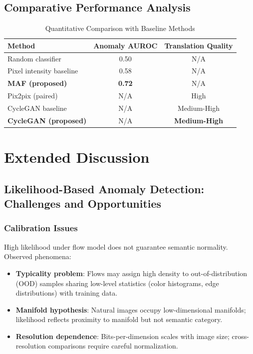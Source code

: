 \documentclass[conference]{IEEEtran}
\begin{document}
\subsection{Comparative Performance Analysis}
\begin{table}[!t]
\caption{Quantitative Comparison with Baseline Methods}
\label{tab:comparison}
\centering
\begin{tabular}{lcc}
\hline
\textbf{Method} & \textbf{Anomaly AUROC} & \textbf{Translation Quality} \\
\hline
Random classifier & 0.50 & N/A \\
Pixel intensity baseline & 0.58 & N/A \\
\textbf{MAF (proposed)} & \textbf{0.72} & N/A \\
\hline
Pix2pix (paired) & N/A & High \\
CycleGAN baseline & N/A & Medium-High \\
\textbf{CycleGAN (proposed)} & N/A & \textbf{Medium-High} \\
\hline
\end{tabular}
\end{table}

\section{Extended Discussion}
\subsection{Likelihood-Based Anomaly Detection: Challenges and Opportunities}
\subsubsection{Calibration Issues}
High likelihood under flow model does not guarantee semantic normality. Observed phenomena:
\begin{itemize}
\item \textbf{Typicality problem}: Flows may assign high density to out-of-distribution (OOD) samples sharing low-level statistics (color histograms, edge distributions) with training data.
\item \textbf{Manifold hypothesis}: Natural images occupy low-dimensional manifolds; likelihood reflects proximity to manifold but not semantic category.
\item \textbf{Resolution dependence}: Bits-per-dimension scales with image size; cross-resolution comparisons require careful normalization.
\end{itemize}
\end{document}
